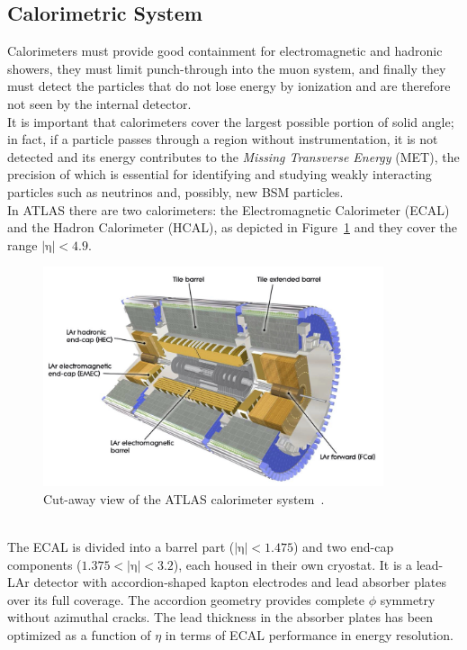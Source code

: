 \subsection{Calorimetric System}
\label{sec:CAL}
Calorimeters must provide good containment for electromagnetic and hadronic showers, they must limit punch-through into the muon system, and finally they must detect the particles that do not lose energy by ionization and are therefore not seen by the internal detector.\\
It is important that calorimeters cover the largest possible portion of solid angle; in fact, if a particle passes through a region without instrumentation, it is not detected and its energy contributes to the \textit{Missing Transverse Energy} (MET), the precision of which is essential for identifying and studying weakly interacting particles such as neutrinos and, possibly, new BSM particles. \\
In ATLAS there are two calorimeters: the Electromagnetic Calorimeter (ECAL)  and the Hadron Calorimeter (HCAL), as depicted in Figure~\ref{fig:cal} and they cover the range $\mathrm{|\eta|<4.9}$.  
\begin{figure}[h]
	\centering
	\includegraphics[width=10cm]{Chapters/CH2/figures/cal}
	\caption{Cut-away view of the ATLAS calorimeter system~\cite{ATLAS}.}
	\label{fig:cal}
\end{figure}
\vspace{\baselineskip}
\\The ECAL is divided into a barrel part ($\mathrm{|\eta|<1.475}$) and two end-cap components ($\mathrm{1.375<|\eta|<3.2}$), each housed in their own cryostat.
It is a lead-LAr detector with accordion-shaped kapton electrodes and lead absorber plates over its full coverage. The accordion geometry provides complete $\phi$ symmetry without azimuthal cracks.
The lead thickness in the absorber plates has been optimized as a function of $\eta$ in terms of ECAL performance in energy resolution. 
